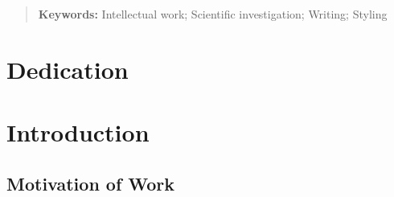 \documentclass[12pt]{report} %
\begin{document}
\newpage %
\thispagestyle{empty}
\mbox{}

\renewcommand\abstractname{\large\uppercase{Summary}}
\begin{abstract}
\thispagestyle{plain}
\setcounter{page}{3}
	
	\lipsum[1-3]
	
	\textbf{Keywords:}
	Intellectual work; Scientific investigation; Writing; Styling
	
	\vfill
\end{abstract}
	\newpage %
	\thispagestyle{empty}
	\mbox{}


\chapter*{Dedication}

\setcounter{page}{5}
	
	\lipsum [4-5]	
		
	\vfill
	
	\newpage %
	\thispagestyle{empty}
	\mbox{}
	


\tableofcontents
\thispagestyle{fancy}

\newpage %
\thispagestyle{empty}
\mbox{}

\listoffigures
\thispagestyle{fancy}

\newpage %
\thispagestyle{empty}
\mbox{}

\listoftables
\thispagestyle{fancy}

\newpage %
\thispagestyle{empty}
\mbox{}


\clearpage
{} %

\chapter{Introduction}

\section{Motivation of Work}
\lipsum[1-3]
\end{document}
